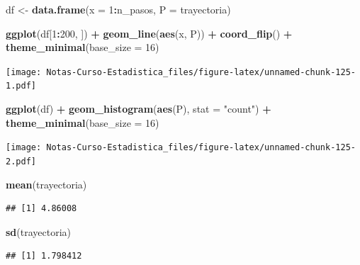 \documentclass[
  12pt,
]{book}
\newenvironment{Shaded}{\begin{snugshade}}{\end{snugshade}}
\newcommand{\DataTypeTok}[1]{\textcolor[rgb]{0.13,0.29,0.53}{#1}}
\newcommand{\DecValTok}[1]{\textcolor[rgb]{0.00,0.00,0.81}{#1}}
\newcommand{\KeywordTok}[1]{\textcolor[rgb]{0.13,0.29,0.53}{\textbf{#1}}}
\newcommand{\NormalTok}[1]{#1}
\newcommand{\OperatorTok}[1]{\textcolor[rgb]{0.81,0.36,0.00}{\textbf{#1}}}
\newcommand{\StringTok}[1]{\textcolor[rgb]{0.31,0.60,0.02}{#1}}
\theoremstyle{definition}
\theoremstyle{definition}
\theoremstyle{definition}
\theoremstyle{remark}
\begin{document}
\begin{Shaded}
\begin{Highlighting}[]
\NormalTok{df <-}\StringTok{ }\KeywordTok{data.frame}\NormalTok{(}\DataTypeTok{x =} \DecValTok{1}\OperatorTok{:}\NormalTok{n_pasos, }\DataTypeTok{P =}\NormalTok{ trayectoria)}

\KeywordTok{ggplot}\NormalTok{(df[}\DecValTok{1}\OperatorTok{:}\DecValTok{200}\NormalTok{, ]) }\OperatorTok{+}\StringTok{ }\KeywordTok{geom_line}\NormalTok{(}\KeywordTok{aes}\NormalTok{(x, P)) }\OperatorTok{+}\StringTok{ }\KeywordTok{coord_flip}\NormalTok{() }\OperatorTok{+}\StringTok{ }
\StringTok{    }\KeywordTok{theme_minimal}\NormalTok{(}\DataTypeTok{base_size =} \DecValTok{16}\NormalTok{)}
\end{Highlighting}
\end{Shaded}

\texttt{[image: Notas-Curso-Estadistica\_files/figure-latex/unnamed-chunk-125-1.pdf]}

\begin{Shaded}
\begin{Highlighting}[]
\KeywordTok{ggplot}\NormalTok{(df) }\OperatorTok{+}\StringTok{ }\KeywordTok{geom_histogram}\NormalTok{(}\KeywordTok{aes}\NormalTok{(P), }\DataTypeTok{stat =} \StringTok{"count"}\NormalTok{) }\OperatorTok{+}\StringTok{ }
\StringTok{    }\KeywordTok{theme_minimal}\NormalTok{(}\DataTypeTok{base_size =} \DecValTok{16}\NormalTok{)}
\end{Highlighting}
\end{Shaded}

\texttt{[image: Notas-Curso-Estadistica\_files/figure-latex/unnamed-chunk-125-2.pdf]}

\begin{Shaded}
\begin{Highlighting}[]
\KeywordTok{mean}\NormalTok{(trayectoria)}
\end{Highlighting}
\end{Shaded}

\begin{verbatim}
## [1] 4.86008
\end{verbatim}

\begin{Shaded}
\begin{Highlighting}[]
\KeywordTok{sd}\NormalTok{(trayectoria)}
\end{Highlighting}
\end{Shaded}

\begin{verbatim}
## [1] 1.798412
\end{verbatim}
\end{document}

